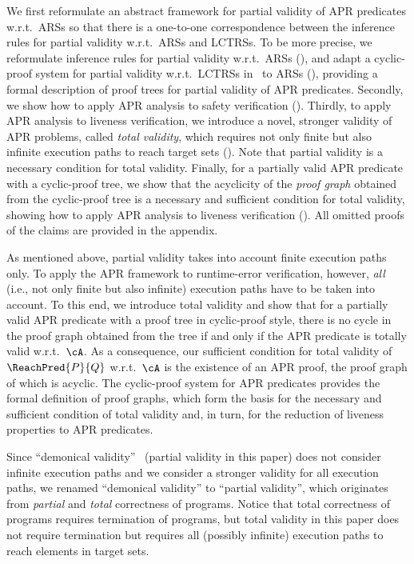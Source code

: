 We first reformulate an abstract framework for partial validity of APR predicates w.r.t.\ ARSs so that there is a one-to-one correspondence between the inference rules for partial validity w.r.t.\ ARSs and LCTRSs.
To be more precise, we reformulate inference rules for partial validity w.r.t.\ ARSs (), and adapt a cyclic-proof system for partial validity w.r.t.\ LCTRSs in~\cite[Section~3.2]{KN24jip} to ARSs (), providing a formal description of proof trees for partial validity of APR predicates.
Secondly, we show how to apply APR analysis to safety verification ().
Thirdly, to apply APR analysis to liveness verification, we introduce a novel, stronger validity of APR problems, called \emph{total validity}, which requires not only finite but also infinite execution paths to reach target sets ().
Note that partial validity is a necessary condition for total validity.
Finally, for a partially valid APR predicate with a cyclic-proof tree, we show that the acyclicity of the \emph{proof graph} obtained from the cyclic-proof tree is a necessary and sufficient condition for total validity, showing how to apply APR analysis to liveness verification ().
All omitted proofs of the claims are provided in the appendix.

As mentioned above, partial validity takes into account finite execution paths only.
To apply the APR framework to runtime-error verification, however, \emph{all} (i.e., not only finite but also infinite) execution paths have to be taken into account.
To this end, we introduce total validity and
show that for a partially valid APR predicate with a proof tree in cyclic-proof style,
there is no cycle in the proof graph obtained from the tree if and only if the APR predicate is totally valid w.r.t.\ $\cA$.
As a consequence, our sufficient condition for total validity of $\ReachPred{P}{Q}$ w.r.t.\ $\cA$ is the existence of an APR proof, the proof graph of which is acyclic.
The cyclic-proof system for APR predicates provides the formal definition of proof graphs, which form the basis for the necessary and sufficient condition of total validity and, in turn, for the reduction of liveness properties to APR predicates.

Since ``demonical validity''~\cite{CL18} (partial validity in this paper) does not consider infinite execution paths and we consider a stronger validity for all execution paths, we renamed ``demonical validity'' to ``partial validity'', which originates from \emph{partial} and \emph{total} correctness of programs.
Notice that total correctness of programs requires termination of programs, but total validity in this paper does not require termination but requires all (possibly infinite) execution paths to reach elements in target sets.

